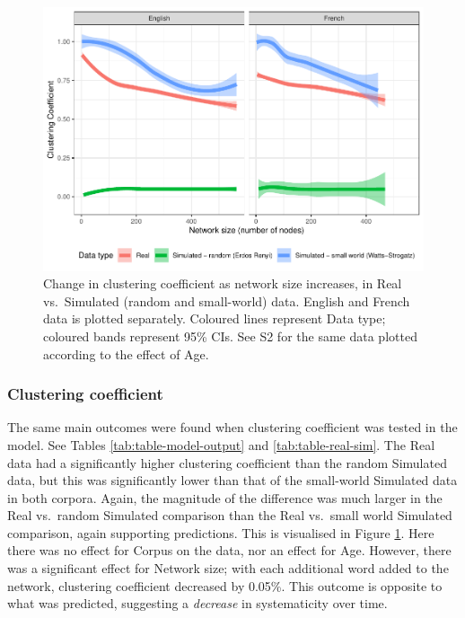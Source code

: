 \documentclass[
  man]{apa6}
\begin{document}
\begin{figure}
\centering
\includegraphics{NetworkGraphs_R1_files/figure-latex/Figure-clust-coef-1.pdf}
\caption{\label{fig:Figure-clust-coef}Change in clustering coefficient as network size increases, in Real vs.~Simulated (random and small-world) data. English and French data is plotted separately. Coloured lines represent Data type; coloured bands represent 95\% CIs. See S2 for the same data plotted according to the effect of Age.}
\end{figure}

\subsubsection{Clustering coefficient}\label{clustering-coefficient}

The same main outcomes were found when clustering coefficient was tested in the model. See Tables \ref{tab:table-model-output} and \ref{tab:table-real-sim}. The Real data had a significantly higher clustering coefficient than the random Simulated data, but this was significantly lower than that of the small-world Simulated data in both corpora. Again, the magnitude of the difference was much larger in the Real vs.~random Simulated comparison than the Real vs.~small world Simulated comparison, again supporting predictions. This is visualised in Figure \ref{fig:Figure-clust-coef}. Here there was no effect for Corpus on the data, nor an effect for Age. However, there was a significant effect for Network size; with each additional word added to the network, clustering coefficient decreased by 0.05\%. This outcome is opposite to what was predicted, suggesting a \emph{decrease} in systematicity over time.
\end{document}

